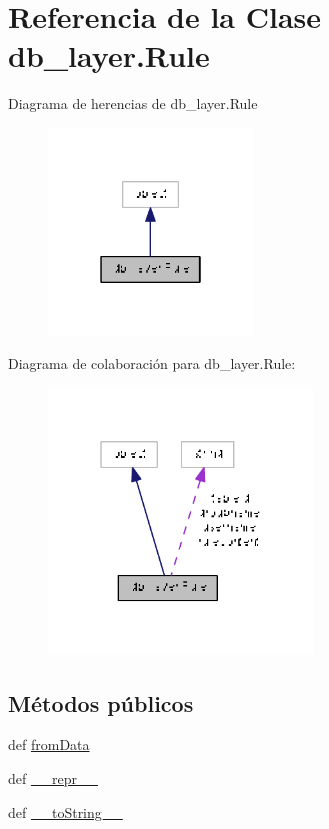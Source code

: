 \hypertarget{classdb__layer_1_1_rule}{\section{Referencia de la Clase db\-\_\-layer.\-Rule}
\label{classdb__layer_1_1_rule}
}


Diagrama de herencias de db\-\_\-layer.\-Rule\nopagebreak
\begin{figure}[H]
\begin{center}
\leavevmode
\includegraphics[width=154pt]{classdb__layer_1_1_rule__inherit__graph}
\end{center}
\end{figure}


Diagrama de colaboración para db\-\_\-layer.\-Rule\-:\nopagebreak
\begin{figure}[H]
\begin{center}
\leavevmode
\includegraphics[width=199pt]{classdb__layer_1_1_rule__coll__graph}
\end{center}
\end{figure}
\subsection*{Métodos públicos}
\begin{DoxyCompactItemize}
\item 
def \hyperlink{classdb__layer_1_1_rule_a9b86f9db748678957d419cbf0ff1ab1b}{from\-Data}
\item 
def \hyperlink{classdb__layer_1_1_rule_a745c8dd200e8dfefd352f1e260e5ab50}{\-\_\-\-\_\-repr\-\_\-\-\_\-}
\item 
def \hyperlink{classdb__layer_1_1_rule_a727eb695fe5bb6d6a42219429ff8c7cc}{\-\_\-\-\_\-to\-String\-\_\-\-\_\-}
\end{DoxyCompactItemize}
